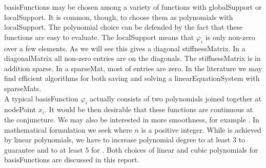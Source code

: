 %
\Gls{basisFunction}s may be chosen among a variety of functions with \gls{globalSupport}
or \gls{localSupport}. It is common, though, to choose them as polynomials with \gls{localSupport}. The polynomial
choice can be defended by the fact that these
functions are easy to evaluate. The \gls{localSupport} means that $\varphi_{i}$ is only non-zero over a few \glspl{element}.
As we will see this gives a diagonal \gls{stiffnessMatrix}. In a \gls{diagonalMatrix} all non-zero entries are on the diagonals.
The \gls{stiffnessMatrix} is in addition sparse. In a \gls{sparseMat}, most of entries are zero. In the literature we may find
efficient \glspl{algorithm} for both saving and solving a \gls{linearEquationSystem} with \glspl{sparseMat}. \\

A typical \gls{basisFunction} $\varphi _{i}$ actually consists of two polynomials joined together at \gls{nodePoint} $x_i$.
It would be then desirable that these functions are continuous at the conjuncture. We may also be interested in more
smoothness, for example . In mathematical formulation we seek  where $n$ is
a positive integer. While  is achieved by linear polynomials, we have to increase polynomial degree to at
least $3$ to guarantee  and to at least $5$ for . Both choices of linear and
cubic polynomials for \glspl{basisFunction} are discussed in this report.
%
